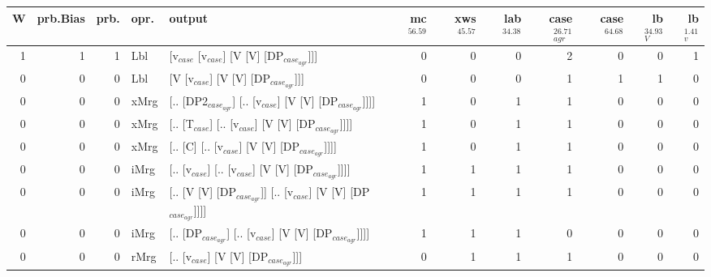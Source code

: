 \begin{tabularx}{\linewidth}{rrrlXrrrrrrr}
\hline
   W &   prb.Bias &   prb. & opr.   & output                                                         &   mc$^{56.59}$ &   xws$^{45.57}$ &   lab$^{34.38}$ &   case$_{agr}^{26.71}$ &   case$^{64.68}$ &   lb$_{V}^{34.93}$ &   lb$_{v}^{1.41}$ \\
\hline
   1 &       1 &   1 & Lbl  & [v$_{case}$ [v$_{case}$] [V [V] [DP$_{case_{agr}}$]]]                        &            0 &             0 &             0 &                  2 &              0 &              0 &             1 \\
   0 &       0 &   0 & Lbl  & [V [v$_{case}$] [V [V] [DP$_{case_{agr}}$]]]                             &            0 &             0 &             0 &                  1 &              1 &              1 &             0 \\
   0 &       0 &   0 & xMrg & [.. [DP2$_{case_{agr}}$] [.. [v$_{case}$] [V [V] [DP$_{case_{agr}}$]]]]        &            1 &             0 &             1 &                  1 &              0 &              0 &             0 \\
   0 &       0 &   0 & xMrg & [.. [T$_{case}$] [.. [v$_{case}$] [V [V] [DP$_{case_{agr}}$]]]]              &            1 &             0 &             1 &                  1 &              0 &              0 &             0 \\
   0 &       0 &   0 & xMrg & [.. [C] [.. [v$_{case}$] [V [V] [DP$_{case_{agr}}$]]]]                   &            1 &             0 &             1 &                  1 &              0 &              0 &             0 \\
   0 &       0 &   0 & iMrg & [.. [v$_{case}$] [.. [v$_{case}$] [V [V] [DP$_{case_{agr}}$]]]]              &            1 &             1 &             1 &                  1 &              0 &              0 &             0 \\
   0 &       0 &   0 & iMrg & [.. [V [V] [DP$_{case_{agr}}$]] [.. [v$_{case}$] [V [V] [DP$_{case_{agr}}$]]]] &            1 &             1 &             1 &                  1 &              0 &              0 &             0 \\
   0 &       0 &   0 & iMrg & [.. [DP$_{case_{agr}}$] [.. [v$_{case}$] [V [V] [DP$_{case_{agr}}$]]]]         &            1 &             1 &             1 &                  0 &              0 &              0 &             0 \\
   0 &       0 &   0 & rMrg & [.. [v$_{case}$] [V [V] [DP$_{case_{agr}}$]]]                            &            0 &             1 &             1 &                  1 &              0 &              0 &             0 \\
\hline
\end{tabularx}\endgroup\\
